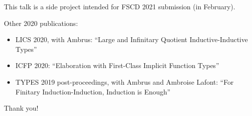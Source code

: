 \documentclass[dvipsnames,10pt,aspectratio=169]{beamer}
\begin{document}
\begin{frame}

This talk is a side project intended for FSCD 2021 submission (in February).
\vspace{1em}

Other 2020 publications:
\begin{itemize}
  \item LICS 2020, with Ambrus: ``Large and Infinitary Quotient Inductive-Inductive Types''
  \item ICFP 2020: ``Elaboration with First-Class Implicit Function Types''
  \item TYPES 2019 post-proceedings, with Ambrus and Ambroise Lafont: ``For
    Finitary Induction-Induction, Induction is Enough''
\end{itemize}

\end{frame}


\begin{frame}

\begin{center} {\large Thank you!} \end{center}

\end{frame}


\end{document}
